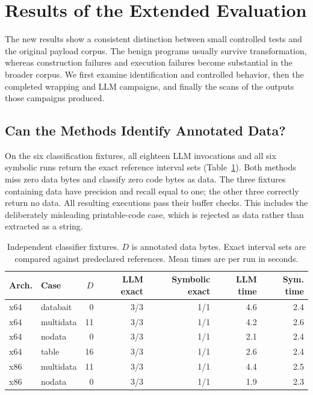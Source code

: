 \section{Results of the Extended Evaluation}\label{sec:extended_results}
The new results show a consistent distinction between small controlled
tests and the original payload corpus. The benign programs usually survive
transformation, whereas construction failures and execution failures become
substantial in the broader corpus. We first examine identification and
controlled behavior, then the completed wrapping and LLM campaigns, and
finally the scans of the outputs those campaigns produced.

\subsection{Can the Methods Identify Annotated Data?}
On the six classification fixtures, all eighteen LLM invocations and all
six symbolic runs return the exact reference interval sets
(Table~\ref{tab:new_classifier}). Both methods miss zero data bytes and
classify zero code bytes as data. The three fixtures containing data have
precision and recall equal to one; the other three correctly return no
data. All resulting executions pass their buffer checks. This includes
the deliberately misleading printable-code case, which is rejected as
data rather than extracted as a string.


\begin{table}[t]
\caption{Independent classifier fixtures. $D$ is annotated data bytes.
Exact interval sets are compared against predeclared references.
Mean times are per run in seconds.}
\label{tab:new_classifier}
\centering\small\setlength{\tabcolsep}{4pt}
\begin{tabular}{@{}llrrrrr@{}}
\toprule
Arch. & Case & $D$ & LLM exact & Symbolic exact & LLM time & Sym. time \\
\midrule
x64 & databait & 0 & 3/3 & 1/1 & 4.6 & 2.4 \\
x64 & multidata & 11 & 3/3 & 1/1 & 4.2 & 2.6 \\
x64 & nodata & 0 & 3/3 & 1/1 & 2.1 & 2.4 \\
x64 & table & 16 & 3/3 & 1/1 & 2.6 & 2.4 \\
x86 & multidata & 11 & 3/3 & 1/1 & 4.4 & 2.5 \\
x86 & nodata & 0 & 3/3 & 1/1 & 1.9 & 2.3 \\
\bottomrule
\end{tabular}
\end{table}


